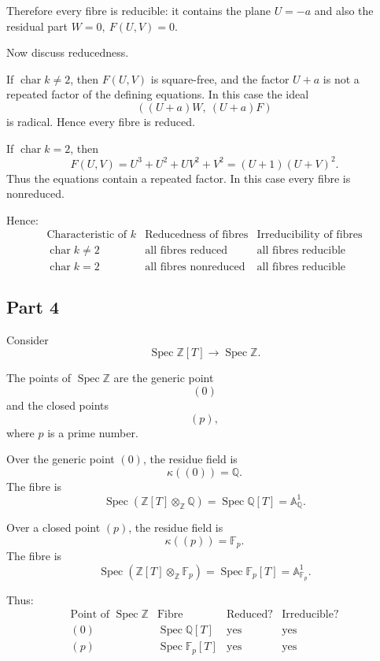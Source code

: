 \documentclass[12pt,a4paper]{article}
\theoremstyle{notespace}
\begin{document}
Therefore every fibre is reducible: it contains the plane \(U=-a\) and
also the residual part \(W=0,\ F(U,V)=0\).

Now discuss reducedness.

If \(\operatorname{char}k\neq 2\), then \(F(U,V)\) is square-free, and
the factor \(U+a\) is not a repeated factor of the defining equations.
In this case the ideal
\[
((U+a)W,\ (U+a)F)
\]
is radical. Hence every fibre is reduced.

If \(\operatorname{char}k=2\), then
\[
F(U,V)
=
U^3+U^2+UV^2+V^2
=
(U+1)(U+V)^2.
\]
Thus the equations contain a repeated factor. In this case every fibre is
nonreduced.

Hence:
\[
\begin{array}{c|c|c}
	\text{Characteristic of }k
	&
	\text{Reducedness of fibres}
	&
	\text{Irreducibility of fibres}
	\\
	\hline
	\operatorname{char}k\neq 2
	&
	\text{all fibres reduced}
	&
	\text{all fibres reducible}
	\\
	\operatorname{char}k=2
	&
	\text{all fibres nonreduced}
	&
	\text{all fibres reducible}
\end{array}
\]

\subsection{Part 4}

Consider
\[
\operatorname{Spec}\mathbb{Z}[T]
\longrightarrow
\operatorname{Spec}\mathbb{Z}.
\]

The points of \(\operatorname{Spec}\mathbb{Z}\) are the generic point
\[
(0)
\]
and the closed points
\[
(p),
\]
where \(p\) is a prime number.

Over the generic point \((0)\), the residue field is
\[
\kappa((0))=\mathbb{Q}.
\]
The fibre is
\[
\operatorname{Spec}\left(\mathbb{Z}[T]\otimes_{\mathbb{Z}}\mathbb{Q}\right)
=
\operatorname{Spec}\mathbb{Q}[T]
=
\mathbb{A}^1_{\mathbb{Q}}.
\]

Over a closed point \((p)\), the residue field is
\[
\kappa((p))=\mathbb{F}_p.
\]
The fibre is
\[
\operatorname{Spec}\left(\mathbb{Z}[T]\otimes_{\mathbb{Z}}\mathbb{F}_p\right)
=
\operatorname{Spec}\mathbb{F}_p[T]
=
\mathbb{A}^1_{\mathbb{F}_p}.
\]

Thus:
\[
\begin{array}{c|c|c|c}
	\text{Point of }\operatorname{Spec}\mathbb{Z}
	&
	\text{Fibre}
	&
	\text{Reduced?}
	&
	\text{Irreducible?}
	\\
	\hline
	(0)
	&
	\operatorname{Spec}\mathbb{Q}[T]
	&
	\text{yes}
	&
	\text{yes}
	\\
	(p)
	&
	\operatorname{Spec}\mathbb{F}_p[T]
	&
	\text{yes}
	&
	\text{yes}
\end{array}
\]
\end{document}
